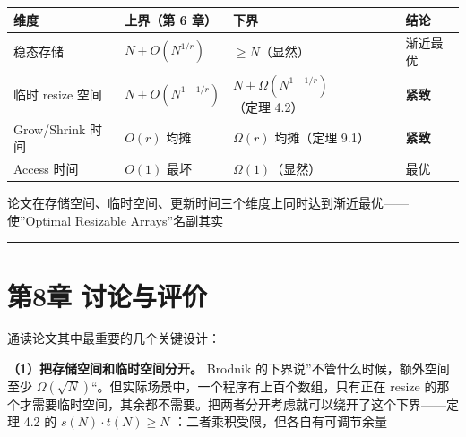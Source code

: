 \documentclass[
  UTF8,
  a4paper,
  12pt]{ctexart}
\newcounter{none} %
\begin{document}
{\def\LTcaptype{none} %
\begin{longtable}[]{@{}
  >{\raggedright\arraybackslash}p{}
  >{\raggedright\arraybackslash}p{}
  >{\raggedright\arraybackslash}p{}
  >{\raggedright\arraybackslash}p{}@{}}
\toprule\noalign{}
\begin{minipage}[b]{\linewidth}\raggedright
维度
\end{minipage} & \begin{minipage}[b]{\linewidth}\raggedright
上界（第 6 章）
\end{minipage} & \begin{minipage}[b]{\linewidth}\raggedright
下界
\end{minipage} & \begin{minipage}[b]{\linewidth}\raggedright
结论
\end{minipage} \\
\midrule\noalign{}
\endhead
\bottomrule\noalign{}
\endlastfoot
稳态存储 & \(N + O(N^{1/r})\) & \(\ge N\)（显然） & 渐近最优 \\
临时 resize 空间 & \(N + O(N^{1-1/r})\) &
\(N + \Omega(N^{1-1/r})\)（定理 4.2） & \textbf{紧致} \\
Grow/Shrink 时间 & \(O(r)\) 均摊 & \(\Omega(r)\) 均摊（定理 9.1） &
\textbf{紧致} \\
Access 时间 & \(O(1)\) 最坏 & \(\Omega(1)\)（显然） & 最优 \\
\end{longtable}
}

论文在存储空间、临时空间、更新时间三个维度上同时达到渐近最优------使''Optimal
Resizable Arrays''名副其实

\begin{center}\rule{0.5\linewidth}{0.5pt}\end{center}

\section{第8章
讨论与评价}\label{ux7b2c8ux7ae0-ux8ba8ux8bbaux4e0eux8bc4ux4ef7}

通读论文其中最重要的几个关键设计：

\textbf{（1）把存储空间和临时空间分开。} Brodnik
的下界说''不管什么时候，额外空间至少
\(\Omega(\sqrt{N})\)``。但实际场景中，一个程序有上百个数组，只有正在
resize
的那个才需要临时空间，其余都不需要。把两者分开考虑就可以绕开了这个下界------定理
4.2 的 \(s(N) \cdot t(N) \ge N\) ：二者乘积受限，但各自有可调节余量
\end{document}
